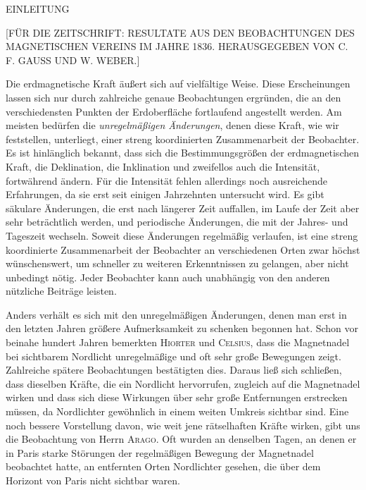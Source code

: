 \clearpage
{}
\begin{center}
{\Large EINLEITUNG}\par\medskip
{\small [FÜR DIE ZEITSCHRIFT: RESULTATE AUS DEN BEOBACHTUNGEN DES MAGNETISCHEN VEREINS IM JAHRE 1836. HERAUSGEGEBEN VON C. F. GAUSS UND W. WEBER.]}
\end{center}
\medskip
Die erdmagnetische Kraft äußert sich auf vielfältige Weise. Diese Erscheinungen lassen sich nur durch zahlreiche genaue Beobachtungen ergründen, die an den verschiedensten Punkten der Erdoberfläche fortlaufend angestellt werden. Am meisten bedürfen die \textit{unregelmäßigen Änderungen}, denen diese Kraft, wie wir feststellen, unterliegt, einer streng koordinierten Zusammenarbeit der Beobachter. Es ist hinlänglich bekannt, dass sich die Bestimmungsgrößen der erdmagnetischen Kraft, die Deklination, die Inklination und zweifellos auch die Intensität, fortwährend ändern. Für die Intensität fehlen allerdings noch ausreichende Erfahrungen, da sie erst seit einigen Jahrzehnten untersucht wird. Es gibt säkulare Änderungen, die erst nach längerer Zeit auffallen, im Laufe der Zeit aber sehr beträchtlich werden, und periodische Änderungen, die mit der Jahres- und Tageszeit wechseln. Soweit diese Änderungen regelmäßig verlaufen, ist eine streng koordinierte Zusammenarbeit der Beobachter an verschiedenen Orten zwar höchst wünschenswert, um schneller zu weiteren Erkenntnissen zu gelangen, aber nicht unbedingt nötig. Jeder Beobachter kann auch unabhängig von den anderen nützliche Beiträge leisten.

Anders verhält es sich mit den unregelmäßigen Änderungen, denen man erst in den letzten Jahren größere Aufmerksamkeit zu schenken begonnen hat. Schon vor beinahe hundert Jahren bemerkten \textsc{Hiorter} und \textsc{Celsius}, dass die Magnetnadel bei sichtbarem Nordlicht unregelmäßige und oft sehr große Bewegungen zeigt. Zahlreiche spätere Beobachtungen bestätigten dies. Daraus ließ sich schließen, dass dieselben Kräfte, die ein Nordlicht hervorrufen, zugleich auf die Magnetnadel wirken und dass sich diese Wirkungen über sehr große Entfernungen erstrecken müssen, da Nordlichter gewöhnlich in einem weiten Umkreis sichtbar sind. Eine noch bessere Vorstellung davon, wie weit jene rätselhaften Kräfte wirken, gibt uns die Beobachtung von Herrn \textsc{Arago}. Oft wurden an denselben Tagen, an denen er in Paris starke Störungen der regelmäßigen Bewegung der Magnetnadel beobachtet hatte, an entfernten Orten Nordlichter gesehen, die über dem Horizont von Paris nicht sichtbar waren.


